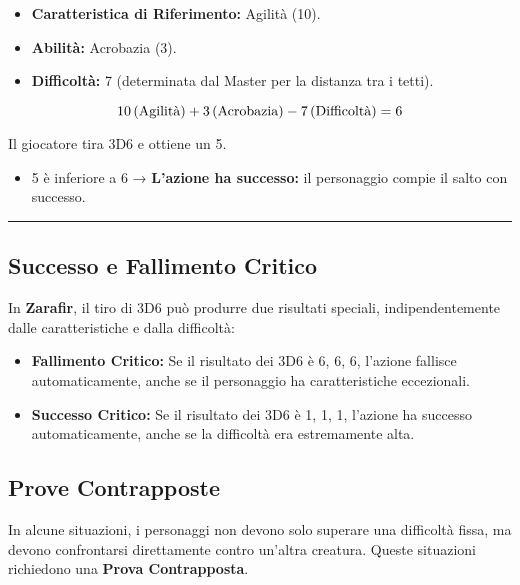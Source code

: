 \documentclass[../manuale_main.tex]{subfiles}
\begin{document}
\begin{itemize}
    \item \textbf{Caratteristica di Riferimento:} Agilità (10).
    \item \textbf{Abilità:} Acrobazia (3).
    \item \textbf{Difficoltà:} 7 (determinata dal Master per la distanza tra i tetti).
\end{itemize}

\[
10 \, (\textnormal{Agilità}) + 3 \, (\textnormal{Acrobazia}) - 7 \, (\textnormal{Difficoltà}) = 6
\]

Il giocatore tira 3D6 e ottiene un 5.

\begin{itemize}
    \item 5 è inferiore a 6 → \textbf{L'azione ha successo:} il personaggio compie il salto con successo.
\end{itemize}

\vspace{0.5cm}
\rule{\textwidth}{0.4pt}
\vspace{0.5cm}

\subsection{Successo e Fallimento Critico}
In \textbf{Zarafir}, il tiro di 3D6 può produrre due risultati speciali, indipendentemente dalle caratteristiche e dalla difficoltà:

\begin{itemize}
    \item \textbf{Fallimento Critico:} Se il risultato dei 3D6 è 6, 6, 6, l'azione fallisce automaticamente, anche se il personaggio ha caratteristiche eccezionali.
    \item \textbf{Successo Critico:} Se il risultato dei 3D6 è 1, 1, 1, l'azione ha successo automaticamente, anche se la difficoltà era estremamente alta.
\end{itemize}

\vspace{0.3cm}

\subsection{Prove Contrapposte}
In alcune situazioni, i personaggi non devono solo superare una difficoltà fissa, ma devono confrontarsi direttamente contro un’altra creatura. Queste situazioni richiedono una \textbf{Prova Contrapposta}.
\end{document}
